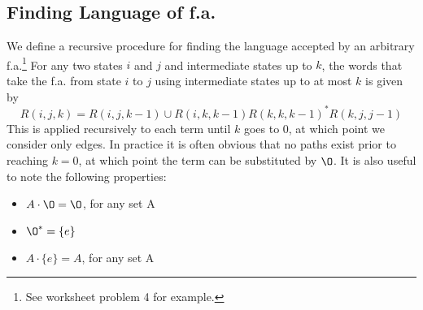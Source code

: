 \documentclass{article}
\begin{document}
		\subsection{Finding Language of f.a.}
	We define a recursive procedure for finding the language accepted by an arbitrary f.a.\footnote{See worksheet problem 4 for example.} For any two states $i$ and $j$ and intermediate states up to $k$, the words that take the f.a. from state $i$ to $j$ using intermediate states up to at most $k$ is given by 
	$$R(i,j,k) = R(i,j,k-1) \cup R(i,k,k-1)R(k,k,k-1)^*R(k,j,j-1)$$
	This is applied recursively to each term until $k$ goes to 0, at which point we consider only edges. In practice it is often obvious that no paths exist prior to reaching $k=0$, at which point the term can be substituted by $\O$. It is also useful to note the following properties:
	\begin{itemize}
		\item $A\cdot \O = \O$, for any set A
		\item $\O^* = \{e\}$
		\item $A \cdot \{e\} = A$, for any set A
	\end{itemize}	 
\end{document}
